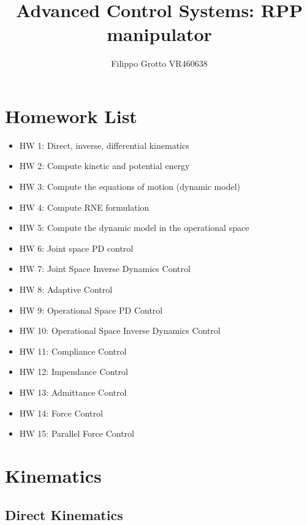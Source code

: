 \documentclass[a4paper,12pt]{article}
\begin{document}
\author{Filippo Grotto VR460638}

\title{Advanced Control Systems: RPP manipulator}

\maketitle
\tableofcontents

\bigskip
\section{Homework List}
\begin{itemize}
    \item HW 1: Direct, inverse, differential kinematics
    \item HW 2: Compute kinetic and potential energy
    \item HW 3: Compute the equations of motion (dynamic model)
    \item HW 4: Compute RNE formulation
    \item HW 5: Compute the dynamic model in the operational space
    \item HW 6: Joint space PD control
    \item HW 7: Joint Space Inverse Dynamics Control
    \item HW 8: Adaptive Control
    \item HW 9: Operational Space PD Control
    \item HW 10: Operational Space Inverse Dynamics Control
    \item HW 11: Compliance Control
    \item HW 12: Impendance Control
    \item HW 13: Admittance Control
    \item HW 14: Force Control
    \item HW 15: Parallel Force Control
\end{itemize}

\newpage
\section{Kinematics}

\subsection{Direct Kinematics}
\end{document}
